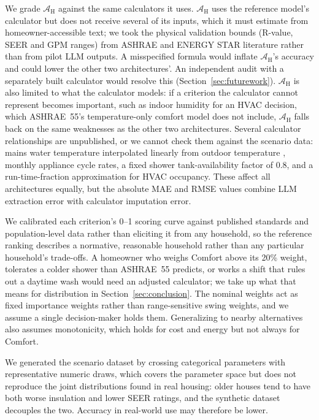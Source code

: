 \documentclass[final,3p,times]{elsarticle}
\begin{document}
We grade $\mathcal{A}_{\text{H}}$ against the same calculators it uses. $\mathcal{A}_{\text{H}}$ uses the reference model's calculator but does not receive several of its inputs, which it must estimate from homeowner-accessible text; we took the physical validation bounds (R-value, SEER and GPM ranges) from ASHRAE and ENERGY STAR literature rather than from pilot LLM outputs. A misspecified formula would inflate $\mathcal{A}_{\text{H}}$'s accuracy and could lower the other two architectures'. An independent audit with a separately built calculator would resolve this (Section~\ref{sec:futurework}). $\mathcal{A}_{\text{H}}$ is also limited to what the calculator models: if a criterion the calculator cannot represent becomes important, such as indoor humidity for an HVAC decision, which ASHRAE~55's temperature-only comfort model does not include, $\mathcal{A}_{\text{H}}$ falls back on the same weaknesses as the other two architectures. Several calculator relationships are unpublished, or we cannot check them against the scenario data: mains water temperature interpolated linearly from outdoor temperature \cite{burch2007}, monthly appliance cycle rates, a fixed shower tank-availability factor of 0.8, and a run-time-fraction approximation for HVAC occupancy. These affect all architectures equally, but the absolute MAE and RMSE values combine LLM extraction error with calculator imputation error.

We calibrated each criterion's 0--1 scoring curve against published standards and population-level data rather than eliciting it from any household, so the reference ranking describes a normative, reasonable household rather than any particular household's trade-offs. A homeowner who weighs Comfort above its 20\% weight, tolerates a colder shower than ASHRAE~55 predicts, or works a shift that rules out a daytime wash would need an adjusted calculator; we take up what that means for distribution in Section~\ref{sec:conclusion}. The nominal weights act as fixed importance weights rather than range-sensitive swing weights, and we assume a single decision-maker holds them. Generalizing to nearby alternatives also assumes monotonicity, which holds for cost and energy but not always for Comfort.

We generated the scenario dataset by crossing categorical parameters with representative numeric draws, which covers the parameter space but does not reproduce the joint distributions found in real housing: older houses tend to have both worse insulation and lower SEER ratings, and the synthetic dataset decouples the two. Accuracy in real-world use may therefore be lower.
\end{document}
